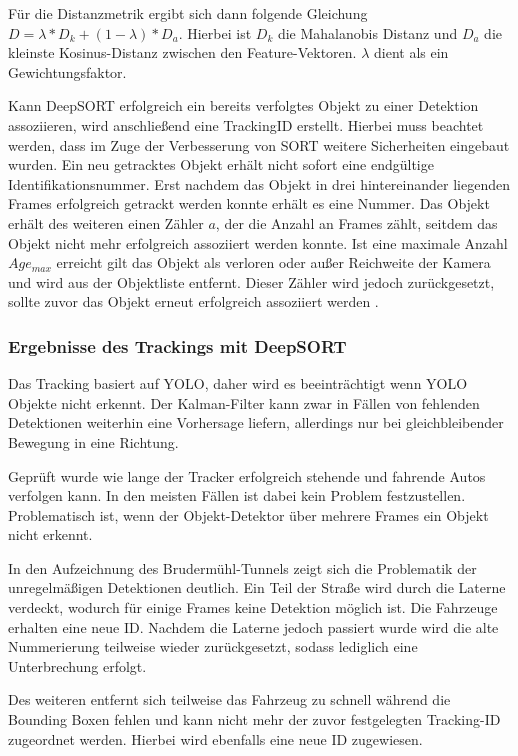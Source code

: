 \documentclass[conference]{IEEEtran}
\begin{document}
	Für die Distanzmetrik ergibt sich dann folgende Gleichung
	$D = \lambda * D_k + (1-\lambda) * D_a$. Hierbei ist $D_k$ die Mahalanobis Distanz und $D_a$ die kleinste Kosinus-Distanz zwischen den Feature-Vektoren. $\lambda$ dient als ein Gewichtungsfaktor.
	
	Kann DeepSORT erfolgreich ein bereits verfolgtes Objekt zu einer Detektion assoziieren, wird anschließend eine TrackingID erstellt. Hierbei muss beachtet werden, dass im Zuge der Verbesserung von SORT weitere Sicherheiten eingebaut wurden. Ein neu getracktes Objekt erhält nicht sofort eine endgültige Identifikationsnummer. Erst nachdem das Objekt in drei hintereinander liegenden Frames erfolgreich getrackt werden konnte erhält es eine Nummer. Das Objekt erhält des weiteren einen Zähler $a$, der die Anzahl an Frames zählt, seitdem das Objekt nicht mehr erfolgreich assoziiert werden konnte. Ist eine maximale Anzahl $Age_{max}$ erreicht gilt das Objekt als verloren oder außer Reichweite der Kamera und wird aus der Objektliste entfernt. Dieser Zähler wird jedoch zurückgesetzt, sollte zuvor das Objekt erneut erfolgreich assoziiert werden \cite{deepSort}.
	
	\subsubsection{Ergebnisse des Trackings mit DeepSORT}
	Das Tracking basiert auf YOLO, daher wird es beeinträchtigt wenn YOLO Objekte nicht erkennt. Der Kalman-Filter kann zwar in Fällen von fehlenden Detektionen weiterhin eine Vorhersage liefern, allerdings nur bei gleichbleibender Bewegung in eine Richtung. 
	
	Geprüft wurde wie lange der Tracker erfolgreich stehende und fahrende Autos verfolgen kann. In den meisten Fällen ist dabei kein Problem festzustellen. Problematisch ist, wenn der Objekt-Detektor über mehrere Frames ein Objekt nicht erkennt.
	
	In den Aufzeichnung des Brudermühl-Tunnels zeigt sich die Problematik der
	unregelmäßigen Detektionen deutlich. Ein Teil der Straße wird durch die Laterne
	verdeckt, wodurch für einige Frames keine Detektion möglich ist. Die Fahrzeuge
	erhalten eine neue ID. Nachdem die Laterne jedoch passiert wurde wird die alte
	Nummerierung teilweise wieder zurückgesetzt, sodass lediglich eine Unterbrechung
	erfolgt.
	
	Des weiteren entfernt sich teilweise das Fahrzeug zu schnell während die Bounding Boxen fehlen und kann nicht
	mehr der zuvor festgelegten Tracking-ID zugeordnet werden. Hierbei wird ebenfalls eine neue ID zugewiesen.
	
\end{document}
